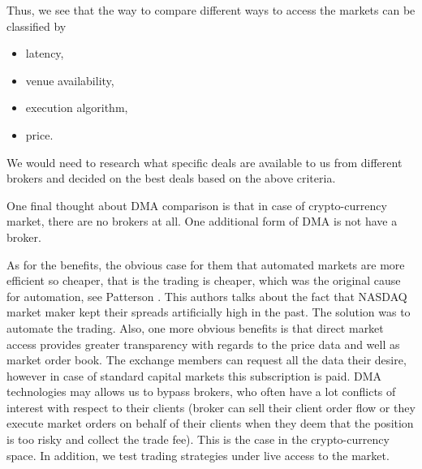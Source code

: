 \documentclass[12pt]{article}
\begin{document}
Thus, we see that the way to compare different ways to access the markets can be classified by
\begin{itemize}
\item latency,
\item venue availability,
\item execution algorithm,
\item price.
\end{itemize}
We would need to research what specific deals are available to us from different brokers and decided on the best deals based on the above criteria.

One final thought about DMA comparison is that in case of crypto-currency market, there are no brokers at all. One additional form of DMA is not have a broker.

As for the benefits, the obvious case for them that automated markets are more efficient so cheaper, that is the trading is cheaper, which was the original cause for automation, see Patterson \cite{patterson}. This authors talks about the fact that NASDAQ market maker kept their spreads artificially high in the past. The solution was to automate the trading. Also, one more obvious benefits is that direct market access provides greater transparency with regards to the price data and well as market order book. The exchange members can request all the data their desire, however in case of standard capital markets this subscription is paid. DMA technologies may allows us to bypass brokers, who often have a lot conflicts of interest with respect to their clients (broker can sell their client order flow or they execute market orders on behalf of their clients when they deem that the position is too risky and collect the trade fee). This is the case in the crypto-currency space. In addition, we test trading strategies under live access to the market.
\end{document}

